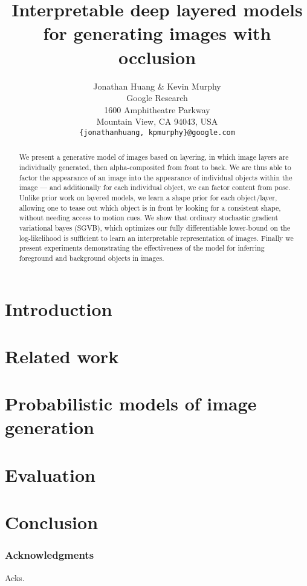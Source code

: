 \documentclass{article} %
\title{Interpretable deep layered models for generating images with occlusion}
\author{Jonathan Huang \& Kevin Murphy \\
Google Research \\
1600 Amphitheatre Parkway \\
Mountain View, CA 94043, USA\\
\texttt{\{jonathanhuang, kpmurphy\}@google.com}
}
\begin{document}
\maketitle

\begin{abstract}
We present a generative model of images based on layering,
in which image layers are individually generated, then alpha-composited
from  front to back.  We are thus able to factor the appearance
of an image into the appearance of individual objects within the image --- and additionally for
each individual object, we can factor content from pose.  
Unlike prior work on layered models, we learn a shape prior for each object/layer, allowing one to
tease out which object is in front by looking for a consistent shape, without needing access to motion cues.
We show that ordinary stochastic gradient variational bayes (SGVB), which optimizes our fully differentiable
lower-bound on the log-likelihood is sufficient to learn an interpretable representation of images.
Finally we present experiments demonstrating the effectiveness of the model for inferring foreground
and background objects in images.
\end{abstract}

\section{Introduction}


\section{Related work}


\section{Probabilistic models of image generation}


\section{Evaluation}


\section{Conclusion}


%

\subsubsection*{Acknowledgments}

Acks.




\end{document}
